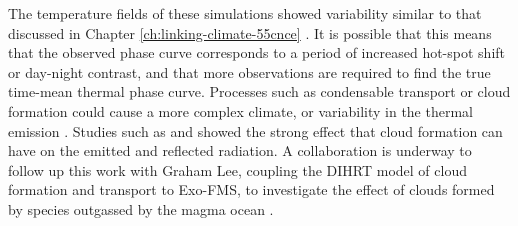 The temperature fields of these simulations showed variability similar to that discussed in Chapter \ref{ch:linking-climate-55cnce} \citep{pierrehumbert2018review}. It is possible that this means that the observed phase curve corresponds to a period of increased hot-spot shift or day-night contrast, and that more observations are required to find the true time-mean thermal phase curve. Processes such as condensable transport or cloud formation could cause a more complex climate, or variability in the thermal emission \citep{parmentier20133d}. Studies such as \citet{parmentier2016transitions} and \citet{lines2018simulating} showed the strong effect that cloud formation can have on the emitted and reflected radiation. A collaboration is underway to follow up this work with Graham Lee, coupling the DIHRT model of cloud formation and transport to Exo-FMS, to investigate the effect of clouds formed by species outgassed by the magma ocean \citep{lee2016dynamic, lines2018simulating}.





